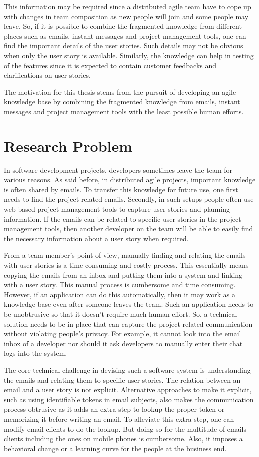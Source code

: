 This information may be required since a distributed agile team have to cope up with changes in team composition as new people will join and some people may leave. So, if it is possible to combine the fragmented knowledge from different places such as emails, instant messages and project management tools, one can find the important details of the user stories. Such details may not be obvious when only the user story is available. Similarly, the knowledge can help in testing of the features since it is expected to contain customer feedbacks and clarifications on user stories.

The motivation for this thesis stems from the pursuit of developing an agile knowledge base by combining the fragmented knowledge from emails, instant messages and project management tools with the least possible human efforts.

\section{Research Problem}
In software development projects, developers sometimes leave the team for various reasons. As said before, in distributed agile projects, important knowledge is often shared by emails. To transfer this knowledge for future use, one first needs to find the project related emails. Secondly, in such setups people often use web-based project management tools to capture user stories and planning information. If the emails can be related to specific user stories in the project management tools, then another developer on the team will be able to easily find the necessary information about a user story when required.

From a team member's point of view, manually finding and relating the emails with user stories is a time-consuming and costly process. This essentially means copying the emails from an inbox and putting them into a system and linking with a user story. This manual process is cumbersome and time consuming. However, if an application can do this automatically, then it may work as a knowledge-base even after someone leaves the team. Such an application needs to be unobtrusive so that it doesn't require much human effort. So, a technical solution needs to be in place that can capture the project-related communication without violating people's privacy. For example, it cannot look into the email inbox of a developer nor should it ask developers to manually enter their chat logs into the system.  

The core technical challenge in devising such a software system is understanding the emails and relating them to specific user stories. The relation between an email and a user story is not explicit. Alternative approaches to make it explicit, such as using identifiable tokens in email subjects, also makes the communication process obtrusive as it adds an extra step to lookup the proper token or memorizing it before writing an email. To alleviate this extra step, one can modify email clients to do the lookup. But doing so for the multitude of emails clients including the ones on mobile phones is cumbersome. Also, it imposes a behavioral change or a learning curve for the people at the business end.

